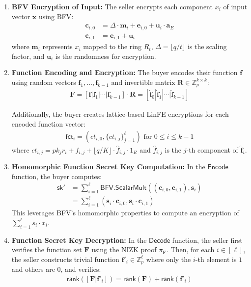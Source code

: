 \begin{enumerate}
    \item \textbf{BFV Encryption of Input:} The seller encrypts each component $x_i$ of input vector $\mathbf{x}$ using BFV:
    \begin{align*}
        \mathbf{c}_{i,0} &= \Delta \cdot \mathbf{m}_i + \mathbf{e}_{i,0} + \mathbf{u}_i \cdot \mathbf{a}_E \\
        \mathbf{c}_{i,1} &= \mathbf{e}_{i,1} + \mathbf{u}_i
    \end{align*}
    where $\mathbf{m}_i$ represents $x_i$ mapped to the ring $R_t$, $\Delta = \lfloor q/t \rfloor$ is the scaling factor, and $\mathbf{u}_i$ is the randomness for encryption.
    
    \item \textbf{Function Encoding and Encryption:} The buyer encodes their function $\mathbf{f}$ using random vectors $\mathbf{f}_1, \ldots, \mathbf{f}_{k-1}$ and invertible matrix $\mathbf{R} \in \mathbb{Z}_p^{k \times k}$:
    \begin{align*}
        \mathbf{F} = [\mathbf{f}|\mathbf{f}_1|\cdots|\mathbf{f}_{k-1}] \cdot \mathbf{R} = [\mathbf{\hat{f}}_0|\mathbf{\hat{f}}_1|\cdots|\mathbf{\hat{f}}_{k-1}]
    \end{align*}

    Additionally, the buyer creates lattice-based LinFE encryptions for each encoded function vector:
    \begin{align*}
        \mathsf{fct}_i = (ct_{i,0}, \{ct_{i,j}\}_{j=1}^{\ell}) \text{ for } 0 \leq i \leq k-1
    \end{align*}
    where $ct_{i,j} = pk_j r_i + f_{i,j} + \lfloor q/K \rfloor \cdot \hat{f}_{i,j} \cdot 1_R$ and $\hat{f}_{i,j}$ is the $j$-th component of $\mathbf{\hat{f}}_i$.
    
    \item \textbf{Homomorphic Function Secret Key Computation:} In the $\mathsf{Encode}$ function, the buyer computes:
    \begin{align*}
        \mathsf{sk'} &= \sum_{i=1}^\ell \mathsf{BFV.ScalarMult}((\mathbf{c}_{i,0}, \mathbf{c}_{i,1}), \mathbf{s}_i) \\
        &= \sum_{i=1}^\ell (\mathbf{s}_i \cdot \mathbf{c}_{i,0}, \mathbf{s}_i \cdot \mathbf{c}_{i,1})
    \end{align*}
    This leverages BFV's homomorphic properties to compute an encryption of $\sum_{i=1}^{\ell} s_i \cdot x_i$.
    
    \item \textbf{Function Secret Key Decryption:} In the $\mathsf{Decode}$ function, the seller first verifies the function set $\mathbf{F}$ using the NIZK proof $\pi_{\mathbf{F}}$. Then, for each $i \in [\ell]$, the seller constructs trivial function $\mathbf{f}'_i \in \mathbb{Z}_p^\ell$ where only the $i$-th element is $1$ and others are $0$, and verifies:
    \begin{align*}
        \mathsf{rank}([\mathbf{F}|\mathbf{f}'_i]) = \mathsf{rank}(\mathbf{F}) + \mathsf{rank}(\mathbf{f}'_i)
    \end{align*}
    

\end{enumerate}
